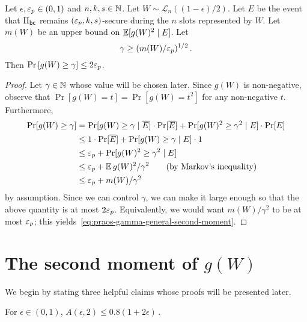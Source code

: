\begin{lemma}\label{lemma:praos-tail-gamma}
  Let $\epsilon, \mathsf{\varepsilon}_p \in (0, 1)$ and $n, k, s \in \mathbb{N}$. 
  Let $W \sim \mathcal{L}_n((1-\epsilon)/2)$.
  Let $E$ be the event that 
  $\Pi_\mathsf{bc}$ remains $(\mathsf{\varepsilon}_p, k, s)$-secure during 
  the $n$ slots represented by $W$. 
  Let $m(W)$ be an upper bound on $\operatorname{\mathbb{E}}[ g(W)^2 \mid E]$.
  Let 
  \begin{equation}\label{eq:praos-gamma-general-second-moment}
    \gamma \geq (m(W)/\mathsf{\varepsilon}_p)^{1/2}
    \,.
  \end{equation}
  Then 
  $
      \Pr\left[g(W) \geq \gamma\right] \leq 2 \mathsf{\varepsilon}_p
  $.
\end{lemma}
\begin{proof}
  Let $\gamma \in \mathbb{N}$ whose value will be chosen later. 
  Since $g(W)$ is non-negative, observe that 
  $\Pr[g(W) = t] = \Pr[g(W) = t^2]$ for any non-negative $t$. 
  Furthermore, 
  \begin{align*}
    \Pr[g(W) \geq \gamma]
    &= \Pr[g(W) \geq \gamma \mid \overline{E}] \cdot \Pr[\overline{E}] 
      + \Pr[g(W)^2 \geq \gamma^2 \mid E] \cdot \Pr[E]\\
    &\leq 1 \cdot \Pr[\overline{E}] + \Pr[g(W) \geq \gamma \mid E] \cdot 1 \\
    &\leq \mathsf{\varepsilon}_p + \Pr[g(W)^2 \geq \gamma^2 \mid E] \\
    &\leq \mathsf{\varepsilon}_p + \operatorname{\mathbb{E}} g(W)^2/\gamma^2 \qquad \text{(by Markov's inequality)} \\
    &\leq \mathsf{\varepsilon}_p + m(W)/\gamma^2 
  \end{align*}
  by assumption. Since we can control $\gamma$,
  we can make it large enough so that the above quantity is at most $2 \mathsf{\varepsilon}_p$. 
  Equivalently, we would want 
  $m(W)/\gamma^2$ to be at most $\mathsf{\varepsilon}_p$; 
  this yields~\eqref{eq:praos-gamma-general-second-moment}.
\end{proof}


\section{The second moment of \texorpdfstring{$g(W)$}{the grinding power}}

We begin by stating three helpful claims 
whose proofs will be presented later.

\begin{claim}\label{claim:multiple-honest-blocks}
  For $\epsilon \in (0, 1)$, 
  $
    A(\epsilon, 2) 
    \leq 0.8 (1 + 2 \epsilon)
    \,.
  $
\end{claim}


